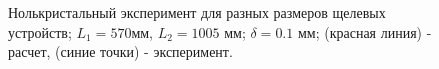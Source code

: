\begin{figure}[H]
  \hfill
  \hfill
  \hfill
  \caption{Нолькристальный эксперимент для разных размеров щелевых устройств; $L_1= 570 $мм,
  $L_2 = 1005$ мм; $\delta = 0.1$ мм; (красная линия) - расчет, (синие точки) - эксперимент.  }
  \label{ris:zero_exp}
\end{figure}
